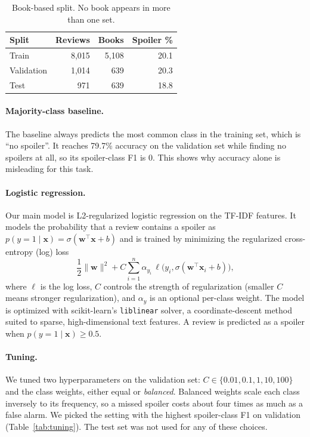 \documentclass[11pt]{article}
\begin{document}
\begin{table}[t]
  \centering
  \small
  \begin{tabular}{lrrr}
    \hline
    \textbf{Split} & \textbf{Reviews} & \textbf{Books} & \textbf{Spoiler \%} \\
    \hline
    Train      & 8{,}015 & 5{,}108 & 20.1 \\
    Validation & 1{,}014 &    639  & 20.3 \\
    Test       &    971  &    639  & 18.8 \\
    \hline
  \end{tabular}
  \caption{\label{tab:splits}Book-based split. No book appears in more than one set.}
\end{table}

\paragraph{Majority-class baseline.}
The baseline always predicts the most common class in the training set, which is ``no spoiler''. It reaches 79.7\% accuracy on the validation set while finding no spoilers at all, so its spoiler-class F1 is 0. This shows why accuracy alone is misleading for this task.

\paragraph{Logistic regression.}
Our main model is L2-regularized logistic regression on the TF-IDF features. It models the probability that a review contains a spoiler as $p(y=1\mid\mathbf{x}) = \sigma(\mathbf{w}^\top\mathbf{x} + b)$ and is trained by minimizing the regularized cross-entropy (log) loss
\begin{equation}
  \frac{1}{2}\lVert\mathbf{w}\rVert^2 + C\sum_{i=1}^{n} \alpha_{y_i}\, \ell\big(y_i, \sigma(\mathbf{w}^\top\mathbf{x}_i + b)\big),
\end{equation}
where $\ell$ is the log loss, $C$ controls the strength of regularization (smaller $C$ means stronger regularization), and $\alpha_{y}$ is an optional per-class weight. The model is optimized with scikit-learn's \texttt{liblinear} solver, a coordinate-descent method suited to sparse, high-dimensional text features. A review is predicted as a spoiler when $p(y=1\mid\mathbf{x}) \geq 0.5$.

\paragraph{Tuning.}
We tuned two hyperparameters on the validation set: $C \in \{0.01, 0.1, 1, 10, 100\}$ and the class weights, either equal or \emph{balanced}. Balanced weights scale each class inversely to its frequency, so a missed spoiler costs about four times as much as a false alarm. We picked the setting with the highest spoiler-class F1 on validation (Table~\ref{tab:tuning}). The test set was not used for any of these choices.
\end{document}
